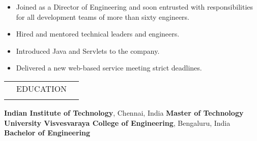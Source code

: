 \documentclass[a4paper, 13pt,line]{article}
\begin{document}
\begin{itemize}
\item Joined as a Director of Engineering and soon entrusted with
responsibilities for all development teams of more than sixty engineers.
\item Hired and mentored technical leaders and engineers.
\item Introduced Java and Servlets to the company.
\item Delivered a new web-based service meeting strict deadlines.
\end{itemize}

\begin{table}[H]
{\renewcommand{\arraystretch}{1.9}
\begin{tabularx}{\textwidth}{XcX}
\hline\hline\Xhline{2.5\arrayrulewidth}
\rowcolor{Gray}      &EDUCATION& \\
\Xhline{2.5\arrayrulewidth}
\hline
\end{tabularx}
}
\end{table}

\noindent\textbf{Indian Institute of Technology}, Chennai, India \hfill \textbf{Master of Technology}\vspace{1mm}\\
\textbf{University Visvesvaraya College of Engineering}, Bengaluru, India \hfill \textbf{Bachelor of Engineering}\vspace{-1.5mm}\\%
\end{document}
